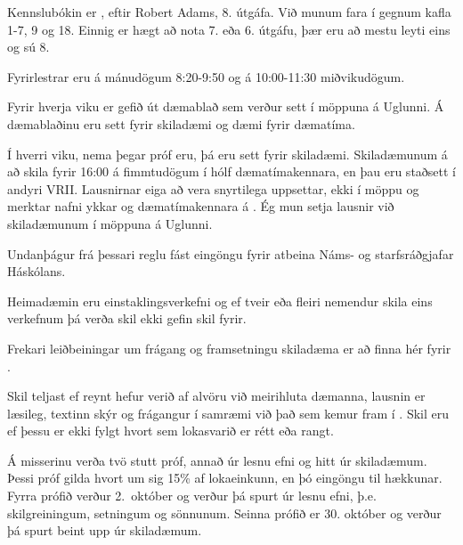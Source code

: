 \documentclass[b5paper,10pt,icelandic]{sphinxmanual}
\begin{document}
 Kennslubókin er , eftir
Robert Adams, 8. útgáfa. Við munum fara í gegnum kafla 1-7, 9 og
18. Einnig er hægt að nota 7. eða 6. útgáfu, þær eru að mestu leyti eins og sú 8.

 Fyrirlestrar eru á mánudögum 8:20-9:50 og á
10:00-11:30 miðvikudögum.

 Fyrir hverja viku er gefið út dæmablað sem
verður sett í  möppuna á Uglunni. Á dæmablaðinu eru sett fyrir
skiladæmi og dæmi fyrir dæmatíma.

 Í hverri viku, nema þegar próf eru, þá eru sett fyrir
skiladæmi. Skiladæmunum á að skila fyrir 16:00 á fimmtudögum í hólf
dæmatímakennara, en þau eru staðsett í andyri VRII. Lausnirnar eiga að
vera snyrtilega uppsettar, ekki í möppu og merktar nafni ykkar og
dæmatímakennara á . Ég mun setja lausnir við
skiladæmunum í möppuna  á Uglunni.

\begin{center}
\end{center}
Undanþágur frá þessari reglu fást eingöngu fyrir atbeina Náms- og starfsráðgjafar Háskólans.

Heimadæmin eru einstaklingsverkefni og ef tveir eða fleiri nemendur skila
eins verkefnum þá verða skil ekki gefin skil fyrir.

Frekari leiðbeiningar um frágang og framsetningu skiladæma er að finna
hér fyrir {\hyperref[\detokenize{vidauki:fragangurskiladaema}]{}}.

Skil teljast  ef reynt hefur verið af alvöru við meirihluta
dæmanna, lausnin er læsileg, textinn skýr og frágangur í samræmi við það sem
kemur fram í {\hyperref[\detokenize{vidauki:fragangurskiladaema}]{}}.
Skil eru  ef þessu er ekki fylgt hvort sem
lokasvarið er rétt eða rangt.

 Á misserinu verða tvö stutt próf, annað úr lesnu efni og
hitt úr skiladæmum. Þessi próf gilda hvort um sig 15\% af lokaeinkunn, en
þó eingöngu til hækkunar. Fyrra prófið verður 2. október og verður þá
spurt úr lesnu efni, þ.e. skilgreiningum, setningum og sönnunum. Seinna
prófið er 30. október og verður þá spurt beint upp úr skiladæmum.
\end{document}
